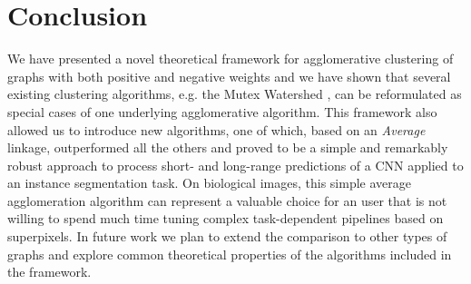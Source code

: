\section{Conclusion}
We have presented a novel theoretical framework for agglomerative clustering of graphs with both positive and negative weights and we have shown that several existing clustering algorithms, e.g. the Mutex Watershed \cite{wolf2018mutex}, can be reformulated as special cases of one underlying agglomerative algorithm. This framework also allowed us to introduce new algorithms, one of which, based on an \emph{Average} linkage, outperformed all the others and proved to be a simple and remarkably robust approach to process short- and long-range predictions of a CNN applied to an instance segmentation task.
On biological images, this simple average agglomeration algorithm can represent a valuable choice for an user that is not willing to spend much time tuning complex task-dependent pipelines based on superpixels.  %
In future work we plan to extend the comparison to other types of graphs and explore common theoretical properties of the algorithms included in the framework.

